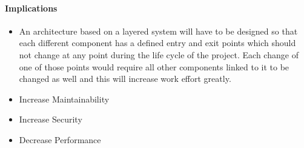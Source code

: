 \paragraph{Implications}
\begin{itemize}
	\item 
	An architecture based on a layered system will have to be designed so that each different component has a defined entry and exit points which should not change at any point during the life cycle of the project. Each change of one of those points would require all other components linked to it to be changed as well and this will increase work effort greatly.

	\item Increase Maintainability
	\item Increase Security
	\item Decrease Performance
\end{itemize}
